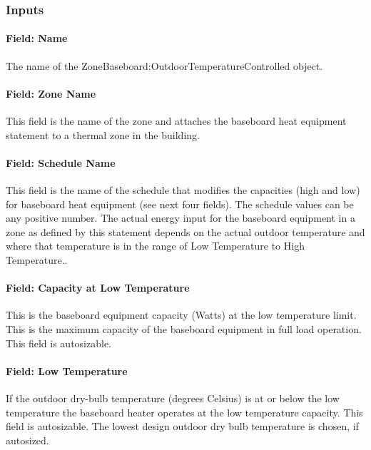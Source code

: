 \subsubsection{Inputs}\label{inputs-18-003}

\paragraph{Field: Name}\label{field-name-18-003}

The name of the ZoneBaseboard:OutdoorTemperatureControlled object.

\paragraph{Field: Zone Name}\label{field-zone-name-7-002}

This field is the name of the zone and attaches the baseboard heat equipment statement to a thermal zone in the building.

\paragraph{Field: Schedule Name}\label{field-schedule-name-11}

This field is the name of the schedule that modifies the capacities (high and low) for baseboard heat equipment (see next four fields). The schedule values can be any positive number. The actual energy input for the baseboard equipment in a zone as defined by this statement depends on the actual outdoor temperature and where that temperature is in the range of Low Temperature to High Temperature..

\paragraph{Field: Capacity at Low Temperature}\label{field-capacity-at-low-temperature}

This is the baseboard equipment capacity (Watts) at the low temperature limit. This is the maximum capacity of the baseboard equipment in full load operation. This field is autosizable.

\paragraph{Field: Low Temperature}\label{field-low-temperature}

If the outdoor dry-bulb temperature (degrees Celsius) is at or below the low temperature the baseboard heater operates at the low temperature capacity. This field is autosizable. The lowest design outdoor dry bulb temperature is chosen, if autosized.


